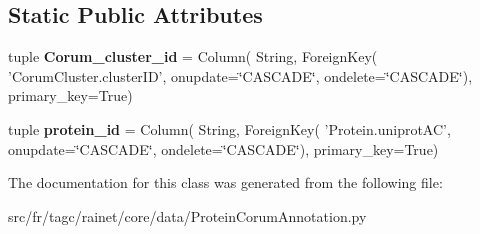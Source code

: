 \subsection*{Static Public Attributes}
\begin{DoxyCompactItemize}
\item 
\hypertarget{classsrc_1_1fr_1_1tagc_1_1rainet_1_1core_1_1data_1_1ProteinCorumAnnotation_1_1ProteinCorumAnnotation_a9306efea729dc7d9aad3f154858333bf}{tuple {\bfseries Corum\-\_\-cluster\-\_\-id} = Column( String, Foreign\-Key( 'Corum\-Cluster.\-cluster\-I\-D', onupdate=\char`\"{}C\-A\-S\-C\-A\-D\-E\char`\"{}, ondelete=\char`\"{}C\-A\-S\-C\-A\-D\-E\char`\"{}), primary\-\_\-key=True)}\label{classsrc_1_1fr_1_1tagc_1_1rainet_1_1core_1_1data_1_1ProteinCorumAnnotation_1_1ProteinCorumAnnotation_a9306efea729dc7d9aad3f154858333bf}

\item 
\hypertarget{classsrc_1_1fr_1_1tagc_1_1rainet_1_1core_1_1data_1_1ProteinCorumAnnotation_1_1ProteinCorumAnnotation_a84512b0e74c6870ddb4e49dae997296b}{tuple {\bfseries protein\-\_\-id} = Column( String, Foreign\-Key( 'Protein.\-uniprot\-A\-C', onupdate=\char`\"{}C\-A\-S\-C\-A\-D\-E\char`\"{}, ondelete=\char`\"{}C\-A\-S\-C\-A\-D\-E\char`\"{}), primary\-\_\-key=True)}\label{classsrc_1_1fr_1_1tagc_1_1rainet_1_1core_1_1data_1_1ProteinCorumAnnotation_1_1ProteinCorumAnnotation_a84512b0e74c6870ddb4e49dae997296b}

\end{DoxyCompactItemize}


The documentation for this class was generated from the following file\-:\begin{DoxyCompactItemize}
\item 
src/fr/tagc/rainet/core/data/Protein\-Corum\-Annotation.\-py\end{DoxyCompactItemize}
